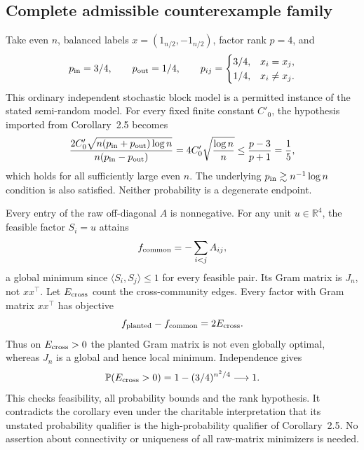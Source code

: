 \documentclass[10pt]{article}
\begin{document}
\subsection*{Complete admissible counterexample family}
Take even \(n\), balanced labels \(x=(1_{n/2},-1_{n/2})\), factor rank \(p=4\), and \[p_{\rm in}=3/4,\qquad p_{\rm out}=1/4,\qquad
 p_{ij}=\begin{cases}3/4,&x_i=x_j,\\1/4,&x_i\ne x_j.\end{cases}\] This ordinary independent stochastic block model is a permitted instance of the stated semi-random model. For every fixed finite constant \(C'_0\), the hypothesis imported from Corollary 2.5 becomes \[\frac{2C'_0\sqrt{n(p_{\rm in}+p_{\rm out})\log n}}
 {n(p_{\rm in}-p_{\rm out})}
 =4C'_0\sqrt{\frac{\log n}{n}}
 \le\frac{p-3}{p+1}=\frac15,\] which holds for all sufficiently large even \(n\). The underlying \(p_{\rm in}\gtrsim n^{-1}\log n\) condition is also satisfied. Neither probability is a degenerate endpoint.\par
Every entry of the raw off-diagonal \(A\) is nonnegative. For any unit \(u\in\mathbb R^4\), the feasible factor \(S_i=u\) attains \[f_{\rm common}=-\sum_{i<j}A_{ij},\] a global minimum since \(\langle S_i,S_j\rangle\le1\) for every feasible pair. Its Gram matrix is \(J_n\), not \(xx^\top\). Let \(E_{\rm cross}\) count the cross-community edges. Every factor with Gram matrix \(xx^\top\) has objective \[f_{\rm planted}-f_{\rm common}=2E_{\rm cross}.\] Thus on \(E_{\rm cross}>0\) the planted Gram matrix is not even globally optimal, whereas \(J_n\) is a global and hence local minimum. Independence gives \[\mathbb P(E_{\rm cross}>0)=1-(3/4)^{n^2/4}\longrightarrow1.\] This checks feasibility, all probability bounds and the rank hypothesis. It contradicts the corollary even under the charitable interpretation that its unstated probability qualifier is the high-probability qualifier of Corollary 2.5. No assertion about connectivity or uniqueness of all raw-matrix minimizers is needed.\par
\end{document}
